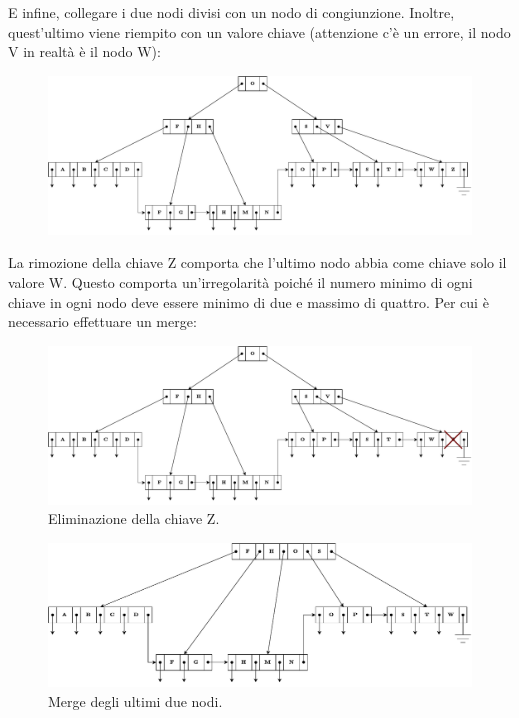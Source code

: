 \documentclass[a4paper]{article}
\begin{document}
	\noindent
	E infine, collegare i due nodi divisi con un nodo di congiunzione. Inoltre, quest'ultimo viene riempito con un valore chiave (attenzione c'è un errore, il nodo V in realtà è il nodo W):
	\begin{figure}[!htp]
		\centering
		\includegraphics[width=\textwidth]{img/b+-tree-6.pdf}
	\end{figure}
	
	\noindent
	La rimozione della chiave Z comporta che l'ultimo nodo abbia come chiave solo il valore W. Questo comporta un'irregolarità poiché il numero minimo di ogni chiave in ogni nodo deve essere minimo di due e massimo di quattro. Per cui è necessario effettuare un merge:
	\begin{figure}[!htp]
		\centering
		\includegraphics[width=\textwidth]{img/b+-tree-7.pdf}
		\caption*{Eliminazione della chiave Z.}
	\end{figure}
	
	\begin{figure}[!htp]
		\centering
		\includegraphics[width=\textwidth]{img/b+-tree-8.pdf}
		\caption*{Merge degli ultimi due nodi.}
	\end{figure}\newpage
	
\end{document}
